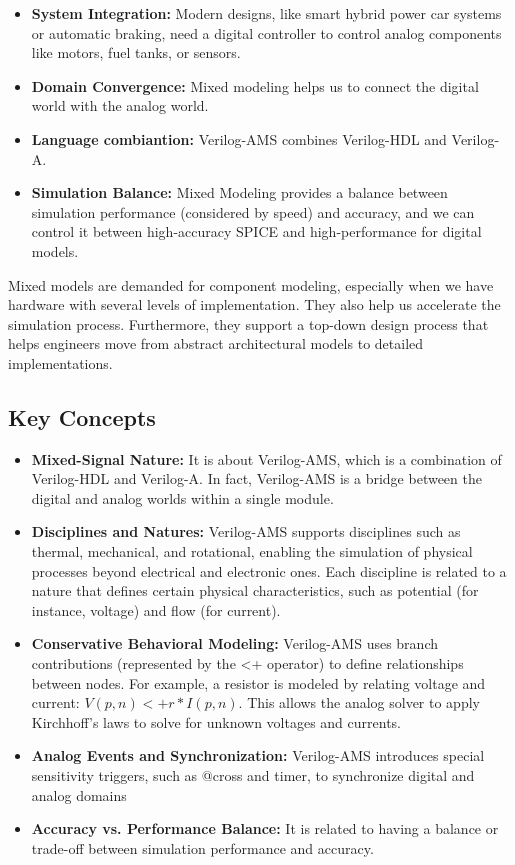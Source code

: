 \documentclass[12pt, a4paper]{article}
\begin{document}
\begin{itemize}
  \item \textbf{System Integration:} Modern designs, like smart hybrid power car systems or automatic braking, need a digital controller to control analog components like motors, fuel tanks, or sensors.
  \item \textbf{Domain Convergence:} Mixed modeling helps us to connect the digital world with the analog world.
  \item \textbf{Language combiantion:} Verilog-AMS combines Verilog-HDL and Verilog-A.
  \item \textbf{Simulation Balance:} Mixed Modeling provides a balance between simulation performance (considered by speed) and accuracy, and we can control it between high-accuracy SPICE and high-performance for digital models.
\end{itemize}

\noindent Mixed models are demanded for component modeling, especially when we have hardware with several levels of implementation. They also help us accelerate the simulation process. Furthermore, they support a top-down design process that helps engineers move from abstract architectural models to detailed implementations.

\subsection{Key Concepts}

\begin{itemize}
  \item \textbf{Mixed-Signal Nature:} It is about Verilog-AMS, which is a combination of Verilog-HDL and Verilog-A. In fact, Verilog-AMS is a bridge between the digital and analog worlds within a single module.
  \item \textbf{Disciplines and Natures:} Verilog-AMS supports disciplines such as thermal, mechanical, and rotational, enabling the simulation of physical processes beyond electrical and electronic ones. Each discipline is related to a nature that defines certain physical characteristics, such as potential (for instance, voltage) and flow (for current).
  \item \textbf{Conservative Behavioral Modeling:} Verilog-AMS uses branch contributions (represented by the <+ operator) to define relationships between nodes. For example, a resistor is modeled by relating voltage and current: $V(p,n) <+ r * I(p,n)$. This allows the analog solver to apply Kirchhoff’s laws to solve for unknown voltages and currents.
  \item \textbf{Analog Events and Synchronization:} Verilog-AMS introduces special sensitivity triggers, such as @cross and timer, to synchronize digital and analog domains
  \item \textbf{Accuracy vs. Performance Balance:} It is related to having a balance or trade-off between simulation performance and accuracy.
\end{itemize}
\end{document}
